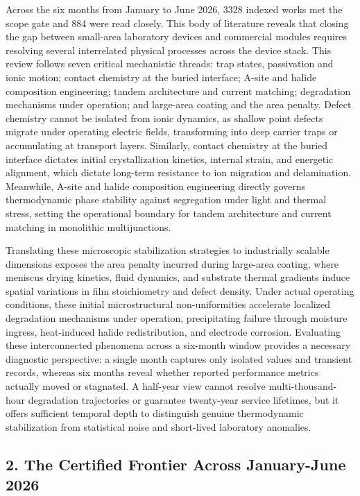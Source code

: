 \documentclass[
  11pt,
]{article}
\begin{document}
Across the six months from January to June 2026, 3328 indexed works met
the scope gate and 884 were read closely. This body of literature
reveals that closing the gap between small-area laboratory devices and
commercial modules requires resolving several interrelated physical
processes across the device stack. This review follows seven critical
mechanistic threads: trap states, passivation and ionic motion; contact
chemistry at the buried interface; A-site and halide composition
engineering; tandem architecture and current matching; degradation
mechanisms under operation; and large-area coating and the area penalty.
Defect chemistry cannot be isolated from ionic dynamics, as shallow
point defects migrate under operating electric fields, transforming into
deep carrier traps or accumulating at transport layers. Similarly,
contact chemistry at the buried interface dictates initial
crystallization kinetics, internal strain, and energetic alignment,
which dictate long-term resistance to ion migration and delamination.
Meanwhile, A-site and halide composition engineering directly governs
thermodynamic phase stability against segregation under light and
thermal stress, setting the operational boundary for tandem architecture
and current matching in monolithic multijunctions.

Translating these microscopic stabilization strategies to industrially
scalable dimensions exposes the area penalty incurred during large-area
coating, where meniscus drying kinetics, fluid dynamics, and substrate
thermal gradients induce spatial variations in film stoichiometry and
defect density. Under actual operating conditions, these initial
microstructural non-uniformities accelerate localized degradation
mechanisms under operation, precipitating failure through moisture
ingress, heat-induced halide redistribution, and electrode corrosion.
Evaluating these interconnected phenomena across a six-month window
provides a necessary diagnostic perspective: a single month captures
only isolated values and transient records, whereas six months reveal
whether reported performance metrics actually moved or stagnated. A
half-year view cannot resolve multi-thousand-hour degradation
trajectories or guarantee twenty-year service lifetimes, but it offers
sufficient temporal depth to distinguish genuine thermodynamic
stabilization from statistical noise and short-lived laboratory
anomalies.

\subsection{2. The Certified Frontier Across January-June
2026}\label{the-certified-frontier-across-january-june-2026}
\end{document}
